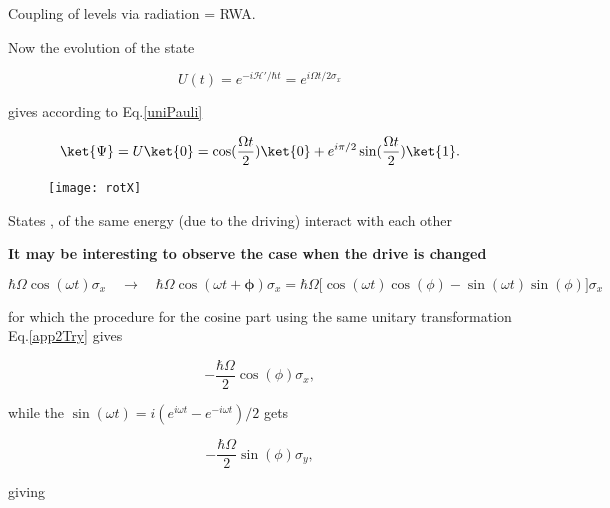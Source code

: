   \begin{center}
    Coupling of levels via radiation = RWA.
  \end{center}

  Now the evolution of the state

  \begin{equation}\label{app2Ev}
    U(t) = e^{-i\mathcal{H'}/\hbar t} = e^{i\Omega t/2\sigma_x}
  \end{equation}

  \noindent gives according to Eq.\eqref{uniPauli}

  \begin{equation}\label{app2State}
    \ket{\Psi} = U\ket{0} = \cos(\frac{\Omega t}{2})\ket{0}+e^{i\pi/2}\sin(\frac{\Omega t}{2})\ket{1}.
  \end{equation}

\begin{figure}[h]
  \centering \texttt{[image: rotX]}
\end{figure}

\noindent

\begin{framed}\noindent
  States ,  of the same energy (due to the driving) interact with each other
\end{framed}
\noindent \textbf{It may be interesting to observe the case when the drive is changed}

  \begin{equation}\label{app2NewPhase}
    \hbar\Omega\cos(\omega t)\sigma_x \quad \rightarrow \quad \hbar\Omega\cos(\omega t+\mathbf{\phi})\sigma_x = \hbar\Omega\bigg[\cos(\omega t)\cos(\phi)-\sin(\omega t)\sin(\phi)\bigg]\sigma_x
  \end{equation}

  \noindent for which the procedure for the cosine part using the same unitary transformation Eq.\eqref{app2Try} gives

  \begin{equation}\label{app2Cos}
    -\frac{\hbar\Omega}{2}\cos(\phi)\sigma_x,
  \end{equation}

  \noindent while the $ \sin(\omega t) = i(e^{i\omega t}-e^{-i\omega t})/2 $ gets

  \begin{equation}\label{app2Sin}
    -\frac{\hbar\Omega}{2}\sin(\phi)\sigma_y,
  \end{equation}

  \noindent giving

